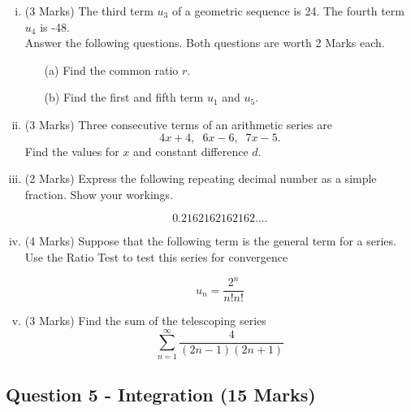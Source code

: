 ﻿ \documentclass[a4paper,12pt]{article}
\begin{document}
\begin{enumerate}[(i)]
	\item (3 Marks)
	The third term $u_3$ of a geometric sequence is 24. The fourth term $u_4$ is -48. \\ \bigskip Answer the following questions. Both questions are worth 2 Marks each.
	\begin{itemize}
		\item[(a)] Find the common ratio $r$. 
		\item[(b)] Find the first and fifth term $u_1$ and $u_5$.
	\end{itemize}
	
	
	\bigskip
	
	\item (3 Marks)	Three consecutive terms of an arithmetic series are 
	\[4x+4,\;\;6x-6,\;\;7x-5.\]
	Find the values for $x$ and constant difference $d$.
	
		\bigskip
		
		\item (2 Marks) Express the following repeating decimal number as a simple fraction. Show your workings.
		
		\[0.2162162162162....\]
		
	\bigskip
	\item (4 Marks) Suppose that the following term is the general term for a series. Use the Ratio Test to test this series for convergence
	
	\[u_n=\frac{2^n}{n!n!}\]
	
	\bigskip
	
	\item (3 Marks) Find the sum of the telescoping series  \[ \sum^{\infty}_{n=1} \frac{4
		}{(2n-1)(2n+1)}\]
	

	\newpage

\end{enumerate}
\subsection*{Question 5 - Integration (15 Marks)}



\end{document}
